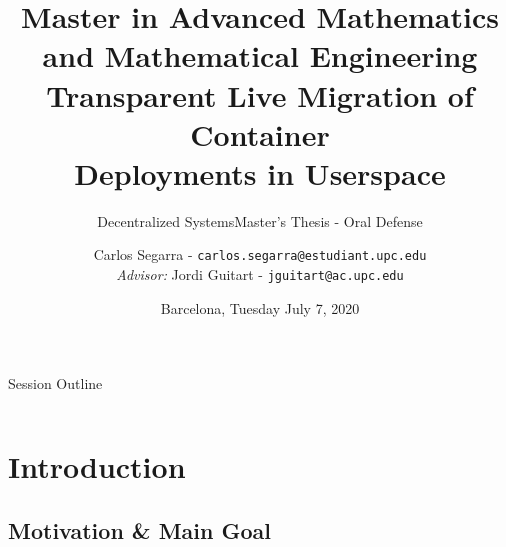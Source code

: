 \documentclass[9pt,    %
    english,            %
    xcolor=table,       %
    envcountsect,        %
    aspectratio=169     %
]{beamer}
\subtitle{Decentralized Systems} %
\title[Live Migration of Containers] %
    {\normalsize Master in Advanced Mathematics and Mathematical Engineering \\[5pt] \Large Transparent Live Migration of Container \\ \Large Deployments in Userspace}
\subtitle{Master's Thesis - Oral Defense} %
\date[July 7, 2020] %
    {Barcelona, Tuesday July 7, 2020}
\author[] %
{Carlos Segarra - \texttt{carlos.segarra@estudiant.upc.edu} \\ \textit{Advisor:} Jordi Guitart - \texttt{jguitart@ac.upc.edu}}
\begin{document}

\begin{frame}
  \titlepage
\end{frame}

\begin{frame}{Session Outline}
    \begin{columns}[T,onlytextwidth]
        \hspace{1.25cm}
        \begin{column}{.4\textwidth}
            \tableofcontents[sections={1-2}]
        \end{column}
        \hspace*{-3.25cm}
        \begin{column}{.4\textwidth}
            \tableofcontents[sections={3-5}]
        \end{column}
    \end{columns}
\end{frame}

\section{Introduction}

\subsection{Motivation \& Main Goal}
\end{document}

